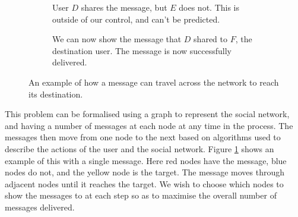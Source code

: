 \documentclass[bsc,frontabs,twoside,singlespacing,parskip,deptreport]{infthesis}     %
\begin{document}
\begin{figure}
\begin{subfigure}[]{0.48\textwidth}
\caption{User $D$ shares the message, but $E$ does not. This is outside of our control, and can't be predicted.}
\end{subfigure}
\quad
%
\begin{subfigure}[]{0.48\textwidth}
\centering
{}
\caption{We can now show the message that $D$ shared to $F$, the destination user. The message is now successfully delivered.}
\end{subfigure}
\caption{An example of how a message can travel across the network to reach its destination.}
\label{fig:intro_example}
\end{figure}

This problem can be formalised using a graph to represent the social network, and having a number of messages at each node at any time in the process. The messages then move from one node to the next based on algorithms used to describe the actions of the user and the social network. Figure \ref{fig:intro_example} shows an example of this with a single message. Here red nodes have the message, blue nodes do not, and the yellow node is the target. The message moves through adjacent nodes until it reaches the target. We wish to choose which nodes to show the messages to at each step so as to maximise the overall number of messages delivered.
\end{document}
